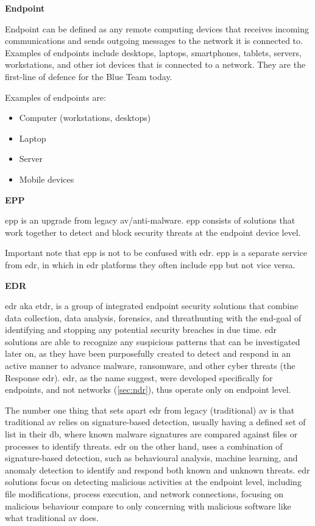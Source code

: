 \begin{multicols}{2}
      \textbf{Endpoint}

      Endpoint can be defined as any remote computing devices that receives incoming communications and sends outgoing messages
      to the network it is connected to. Examples of endpoints include desktops, laptops, smartphones, tablets, servers, workstations,
      and other \acrshort{iot} devices that is connected to a network. They are the first-line of defence for the Blue Team today.

      Examples of endpoints are:
      \begin{itemize}
            \item Computer (workstations, desktops)
            \item Laptop
            \item Server
            \item Mobile devices
      \end{itemize}

      \textbf{EPP}

      \acrshort{epp} is an upgrade from legacy \acrshort{av}/anti-malware. \acrshort{epp} consists of solutions that work together to detect
      and block security threats at the endpoint device level.

      Important note that \acrshort{epp} is not to be confused with \acrshort{edr}. \acrshort{epp} is a separate service from \acrshort{edr},
      in which in \acrshort{edr} platforms they often include \acrshort{epp} but not vice versa.

      \textbf{EDR}

      \acrshort{edr} \acrshort{aka} \acrshort{etdr}, is a group of integrated endpoint security solutions that combine data collection,
      data analysis, forensics, and \gls{threathunting} with the end-goal of identifying and stopping any potential security breaches in due time.
      \acrshort{edr} solutions are able to recognize any suspicious patterns that can be investigated later on, as they have been purposefully
      created to detect and respond in an active manner to advance malware, ransomware, and other cyber threats (the Response \acrshort{edr}).
      \acrshort{edr}, as the name suggest, were developed specifically for endpoints, and not networks (\ref{sec:ndr}), thus operate only
      on endpoint level.

      The number one thing that sets apart \acrshort{edr} from legacy (traditional) \acrshort{av} is that traditional \acrshort{av} relies on
      signature-based detection, usually having a defined set of list in their \acrshort{db}, where known malware signatures are compared
      against files or processes to identify threats. \acrshort{edr} on the other hand, uses a combination of signature-based detection, such
      as behavioural analysis, machine learning, and anomaly detection to identify and respond both known and unknown threats. \acrshort{edr}
      solutions focus on detecting malicious activities at the endpoint level, including file modifications, process execution, and network
      connections, focusing on malicious behaviour compare to only concerning with malicious software like what traditional \acrshort{av} does.


\end{multicols}
